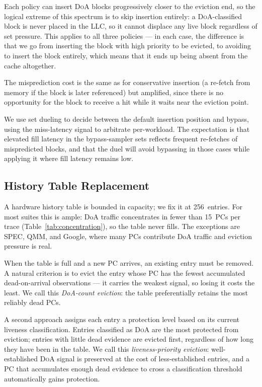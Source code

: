 \documentclass[conference]{IEEEtran}
\newcommand{\doa}{\textsc{DoA}\xspace}
\newcommand{\llc}{\textsc{LLC}\xspace}
\begin{document}
Each policy can insert \doa blocks progressively closer to the eviction end,
so the logical extreme of this spectrum is to skip insertion entirely:
a \doa-classified block is never placed in the \llc, so it cannot displace any
live block regardless of set pressure.
This applies to all three policies --- in each case, the difference is that we 
go from inserting the block with high priority to be evicted, to avoiding to 
insert the block entirely, which means that it ends up being absent from the cache altogether.

The misprediction cost is the same as for conservative insertion (a re-fetch from
memory if the block is later referenced) but amplified, since there is no
opportunity for the block to receive a hit while it waits near the eviction
point.

We use set dueling to decide between the default insertion position and bypass, 
using the miss-latency signal to arbitrate per-workload.
The expectation is that elevated fill latency in the bypass-sampler sets
reflects frequent re-fetches of mispredicted blocks, and that the duel will
avoid bypassing in those cases while applying it where fill latency remains low.

\subsection{History Table Replacement}
\label{sec:histrep}

A hardware history table is bounded in capacity; we fix it at 256~entries.
For most suites this is ample: DoA traffic concentrates in fewer than
15~PCs per trace (Table~\ref{tab:concentration}), so the table never fills.
The exceptions are SPEC, QMM, and Google, where many PCs contribute DoA
traffic and eviction pressure is real.

When the table is full and a new PC arrives, an existing entry must be
removed.
A natural criterion is to evict the entry whose PC has the fewest accumulated
dead-on-arrival observations --- it carries the weakest signal, so losing it
costs the least.
We call this \emph{DoA-count eviction}: the table preferentially retains the
most reliably dead PCs.

A second approach assigns each entry a protection level based on its current
liveness classification.
Entries classified as \doa are the most protected from eviction; entries with
little dead evidence are evicted first, regardless of how long they have been
in the table.
We call this \emph{liveness-priority eviction}: well-established \doa signal
is preserved at the cost of less-established entries, and a PC that
accumulates enough dead evidence to cross a classification threshold
automatically gains protection.
\end{document}
